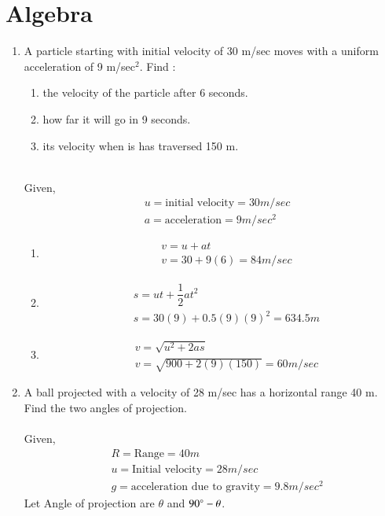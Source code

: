 \documentclass[journal,12pt,twocolumn]{IEEEtran}
\renewcommand\thesection{\arabic{section}}
\begin{document}
 \section{Algebra}
\renewcommand{\theequation}{\theenumi}
\begin{enumerate}[label=\thesection.\arabic*.,ref=\thesection.\theenumi]
\item  A particle starting with initial velocity of 30 m/sec moves with a uniform acceleration of 9 m/sec$^2$. Find :
\begin{enumerate}
   \item the velocity of the particle after 6 seconds.
   \item how far it will go in 9 seconds.
   \item its velocity when is has traversed 150 m.
\end{enumerate}
\solution\\
Given,
\begin{align}
& u = \text{initial velocity} =  30m/sec \\
& a = \text{acceleration} = 9 m/sec^2
\end{align}
\begin{enumerate}
\item
\begin{align} &v = u+at\\ & v =30+9(6) = 84 m/sec \end{align}
\item
\begin{align} &s=ut+\dfrac{1}{2}at^2\\ & s =30(9)+0.5(9)(9)^2 = 634.5m \end{align}
\item
\begin{align} &v = \sqrt{u^2 + 2as}\\ &v= \sqrt{900+2(9)(150)} = 60m/sec  \end{align}
\end{enumerate}
\item A ball projected with a velocity of 28 m/sec has a horizontal range 40 m. Find the two angles of projection.\\
\solution \\
Given,
\begin{align}
&R= \text{Range} = 40m\\
&u = \text{Initial velocity} = 28m/sec\\
&g = \text{acceleration due to gravity} =9.8m/sec^2
\end{align}
Let Angle of projection are $\theta$ and $90\degree-\theta$.

\end{enumerate}
\end{document}
